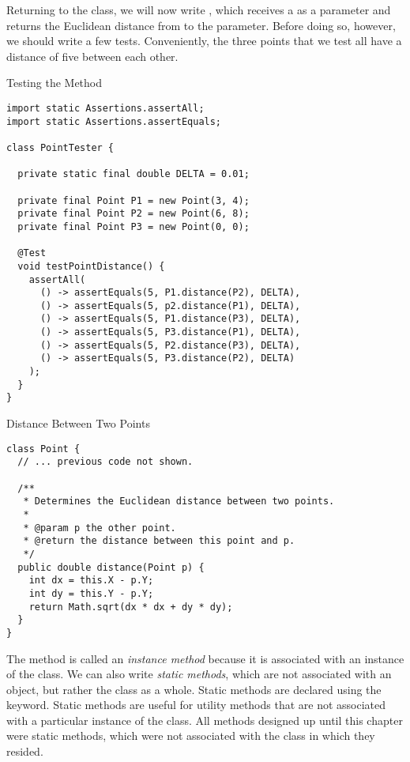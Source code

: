 Returning to the  class, we will now write , which receives a  as a parameter and returns the Euclidean distance from  to the parameter. Before doing so, however, we should write a few tests. Conveniently, the three points that we test all have a distance of five between each other.

\begin{cl}{Testing the  Method}
\begin{lstlisting}[language=MyJava]
import static Assertions.assertAll;
import static Assertions.assertEquals;

class PointTester {

  private static final double DELTA = 0.01;

  private final Point P1 = new Point(3, 4);
  private final Point P2 = new Point(6, 8);
  private final Point P3 = new Point(0, 0);

  @Test
  void testPointDistance() {
    assertAll(
      () -> assertEquals(5, P1.distance(P2), DELTA),
      () -> assertEquals(5, p2.distance(P1), DELTA),
      () -> assertEquals(5, P1.distance(P3), DELTA),
      () -> assertEquals(5, P3.distance(P1), DELTA),
      () -> assertEquals(5, P2.distance(P3), DELTA),
      () -> assertEquals(5, P3.distance(P2), DELTA)
    );
  }
}
\end{lstlisting}
\end{cl}

\begin{cl}{Distance Between Two Points}
\begin{lstlisting}[language=MyJava]
class Point {
  // ... previous code not shown.

  /**
   * Determines the Euclidean distance between two points.
   * 
   * @param p the other point.
   * @return the distance between this point and p.
   */
  public double distance(Point p) {
    int dx = this.X - p.Y;
    int dy = this.Y - p.Y;
    return Math.sqrt(dx * dx + dy * dy);
  }
}
\end{lstlisting}
\end{cl}

The  method is called an \textit{instance method} because it is associated with an instance of the class. We can also write \textit{static methods}, which are not associated with an object, but rather the class as a whole. Static methods are declared using the  keyword. Static methods are useful for utility methods that are not associated with a particular instance of the class. All methods designed up until this chapter were static methods, which were not associated with the class in which they resided.

